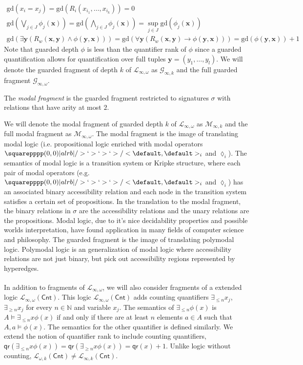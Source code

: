 \begin{eqnarray*}
\text{gd}(x_{i} = x_{j}) = \text{gd}(R_{i}(x_{i_{1}},\dots,x_{i_{k}})) = 0 \\
\text{gd}(\bigvee_{j \in J} \phi_{j}(\mathbf{x})) = \text{gd}(\bigwedge_{j \in J} \phi_{j}(\mathbf{x}))  = \sup_{j \in J} \text{gd}(\phi_{j}(\mathbf{x})) \\
\text{gd}(\exists \mathbf{y} (R_{w}(\mathbf{x},\mathbf{y}) \wedge \phi(\mathbf{y},\mathbf{x}))) = \text{gd}(\forall \mathbf{y}(R_{w}(\mathbf{x},\mathbf{y}) \rightarrow \phi(\mathbf{y},\mathbf{x}))) = \text{gd}(\phi(\mathbf{y},\mathbf{x})) + 1 
\end{eqnarray*}
Note that guarded depth $\phi$ is less than the quantifier rank of $\phi$ since a guarded quantification allows for quantification over full tuples $\mathbf{y} = (y_{1},\dots,y_{l})$. We will denote the guarded fragment of depth $k$ of $\mathcal{L}_{\infty,\omega}$ as $\mathcal{G}_{\infty,k}$ and the full guarded fragment $\mathcal{G}_{\infty,\omega}$.
\begin{defn}
The \textit{modal fragment} is the guarded fragment restricted to signatures $\sigma$ with relations that have arity at most $2$. 
\end{defn}
We will denote the modal fragment of guarded depth $k$ of $\mathcal{L}_{\infty,\omega}$ as $\mathcal{M}_{\infty,k}$ and the full modal fragment as $\mathcal{M}_{\infty,\omega}$. 
The modal fragment is the image of translating modal logic (i.e. propositional logic enriched with modal operators $\amssquare_{i}$ and $\lozenge_{i}$). The semantics of modal logic is a transition system or Kripke structure, where each pair of modal operators (e.g. $\amssquare_{i}$ and $\lozenge_{i}$) has an associated binary accessibility relation and each node in the transition system satisfies a certain set of propositions. In the translation to the modal fragment, the binary relations in $\sigma$ are the accessibility relations and the unary relations are the propositions. Modal logic, due to it's nice decidability properties and possible worlds interpretation, have found application in many fields of computer science and philosophy. The guarded fragment is the image of translating polymodal logic. Polymodal logic is an generalization of modal logic where accessibility relations are not just binary, but pick out accessibility regions represented by hyperedges. \\~\\    
In addition to fragments of $\mathcal{L}_{\infty,\omega}$, we will also consider fragments of a extended logic $\mathcal{L}_{\infty,\omega}(\mathsf{Cnt})$. This logic $\mathcal{L}_{\infty,\omega}(\mathsf{Cnt})$ adds counting quantifiers $\exists_{\leq n}x_{j}$, $\exists_{\geq n}x_{j}$ for every $n \in \mathbb{N}$ and variable $x_{j}$. The semantics of $\exists_{\leq n}\phi(x)$ is $A \vDash \exists_{\leq n}x \phi(x)$ if and only if there are at least $n$ elements $a \in A$ such that $A,a \vDash \phi(x)$. The semantics for the other quantifier is defined similarly. We extend the notion of quantifier rank to include counting quantifiers, $\mathsf{qr}(\exists_{\leq n}x\phi(x)) = \mathsf{qr}(\exists_{\geq n}x\phi(x)) = \mathsf{qr}(x) + 1$. Unlike logic without counting, $\mathcal{L}_{\omega,k}(\mathsf{Cnt}) \not= \mathcal{L}_{\infty,k}(\mathsf{Cnt})$. 

